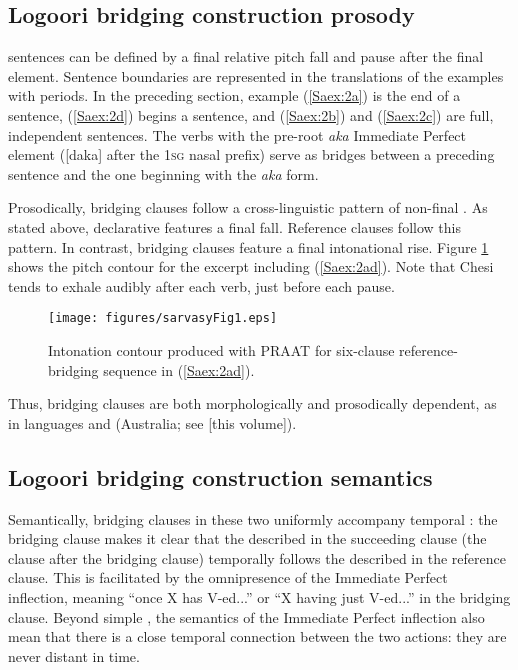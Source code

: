 \documentclass[output=paper]{LSP/langsci}
\begin{document}
\subsection{Logoori bridging construction prosody}
\label{Saprosody}
  sentences can be defined by a final relative pitch fall and pause after the final element. Sentence boundaries are represented in the translations of the examples with periods. In the preceding section, example (\ref{Saex:2a}) is the end of a  sentence, (\ref{Saex:2d}) begins a  sentence, and (\ref{Saex:2b}) and (\ref{Saex:2c}) are full, independent  sentences. The verbs with the pre-root \textit{aka} Immediate Perfect element ([daka] after the \textsc{1sg} nasal prefix) serve as bridges between a preceding  sentence and the one beginning with the \textit{aka} form. 

Prosodically,  bridging clauses follow a cross-linguistic pattern of non-final  \citep{devries.2005}. As stated above,  declarative  features a final fall. Reference clauses follow this pattern. In contrast, bridging clauses feature a final intonational rise. Figure \ref{SaFig1} shows the pitch contour for the excerpt including (\ref{Saex:2ad}). Note that Chesi tends to exhale audibly after each verb, just before each pause.\nocite{PRAAT}


\begin{figure}[ht]
\texttt{[image: figures/sarvasyFig1.eps]}
\caption{Intonation contour produced with PRAAT for six-clause reference-bridging sequence in (\ref{Saex:2ad}). \label{SaFig1}}
\end{figure}

Thus,  bridging clauses are both morphologically  and prosodically dependent, as in  languages and  (Australia; see \citealt{chapters/01Guerin-Aiton} [this volume]).

\subsection{Logoori bridging construction semantics}
\label{Sasemantics}
Semantically,  bridging clauses in these two  uniformly accompany temporal : the bridging clause makes it clear that the  described in the succeeding clause (the clause after the bridging clause) temporally follows the  described in the reference clause. This is facilitated by the omnipresence of the Immediate Perfect inflection, meaning ``once X has V-ed...'' or ``X having just V-ed...'' in the bridging clause. Beyond simple , the semantics of the Immediate Perfect inflection also mean that there is a close temporal connection between the two actions: they are never distant in time.
\end{document}
